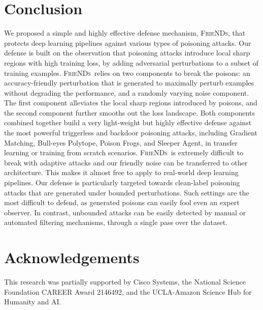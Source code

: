 \documentclass{article}
\newcommand{\alg}{\textsc{FrieNDs}}
\begin{document}
\section{Conclusion}
We proposed a simple and highly effective defense mechanism, \alg, that protects deep learning pipelines against various types of poisoning attacks. 
Our defense is built on the observation that poisoning attacks 
introduce local sharp regions with high training loss, by adding adversarial perturbations to a subset of training examples.
\alg~relies on two components to break the poisons: an accuracy-friendly perturbation that is generated to maximally perturb examples without degrading the performance, and a randomly varying noise component.
The first component %
alleviates the local sharp regions introduced by poisons, and the second component further smooths out the loss landscape.
Both components combined together build a very light-weight but highly effective defense against the most powerful triggerless and backdoor poisoning attacks, including Gradient Matching, Bull-eyes Polytope, Poison Frogs, and Sleeper Agent, in transfer learning or training from scratch scenarios.
\alg~is extremely difficult to break with adaptive attacks and our friendly noise can be transferred to other architecture. This makes it almost free to apply to real-world deep learning pipelines.
Our defense is particularly targeted towards clean-label poisoning attacks that are generated under bounded perturbations. Such settings are the most difficult to defend, as generated poisons can easily fool even an expert observer. %
In contrast, unbounded attacks can be easily detected by manual or automated filtering mechanisms, through a single pass over the dataset.

\section{Acknowledgements}
This research was partially supported by Cisco Systems, the National Science Foundation CAREER Award 2146492, and the UCLA-Amazon Science Hub for Humanity and AI.





\end{document}
